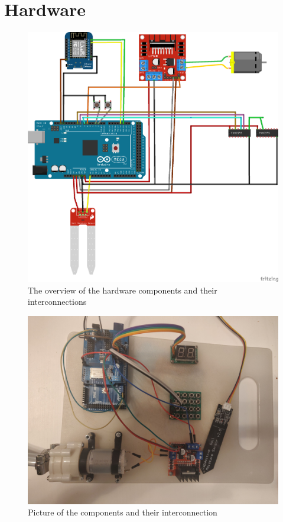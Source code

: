 \section{Hardware} 

\begin{figure}[ht]
    \centering
    \includegraphics[width=\linewidth]{img/IrrigationStationHardware.png}
    \caption{The overview of the hardware components and their interconnections}
    \label{fig:hardware_diagram}
\end{figure}

\begin{figure}[ht]
    \centering
    \includegraphics[width=\linewidth]{img/components.jpg}
    \caption{Picture of the components and their interconnection}
    \label{fig:components}
\end{figure}

